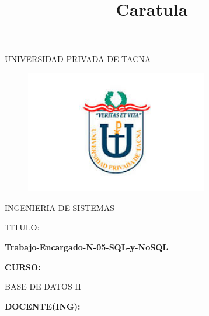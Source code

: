 \documentclass[%
 reprint,
 amsmath,amssymb,
 aps,
]{revtex4-1}
\begin{document}
\title{Caratula}

\begin{titlepage}
\begin{center}
\large{UNIVERSIDAD PRIVADA DE TACNA}\\
\vspace*{-0.025in}
\begin{figure}[htb]
\begin{center}
\includegraphics[width=8cm]{./Imagenes/logo}
\end{center}
\end{figure}
\vspace*{0.15in}
INGENIERIA DE SISTEMAS  \\

\vspace*{0.5in}
\begin{large}
TITULO:\\
\end{large}

\vspace*{0.1in}
\begin{Large}
\textbf{Trabajo-Encargado-N-05-SQL-y-NoSQL} \\
\end{Large}

\vspace*{0.3in}
\begin{Large}
\textbf{CURSO:} \\
\end{Large}

\vspace*{0.1in}
\begin{large}
BASE DE DATOS II\\
\end{large}

\vspace*{0.3in}
\begin{Large}
\textbf{DOCENTE(ING):} \\
\end{Large}


\end{center}
\end{titlepage}
\end{document}

